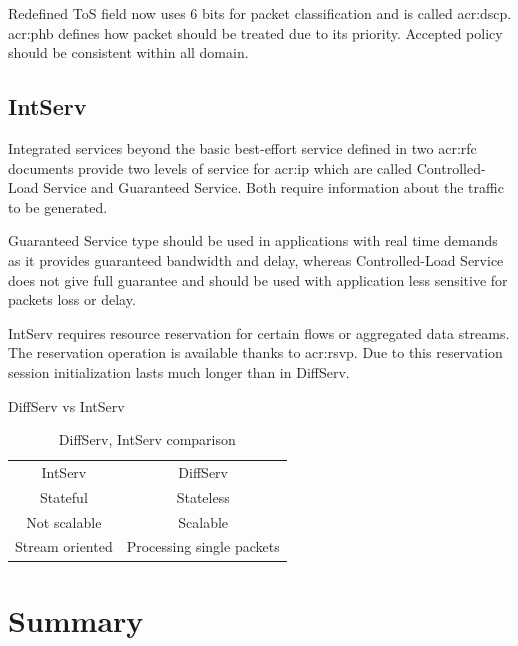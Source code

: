 \documentclass[11pt]{book}
\begin{document}
        \medskip

        Redefined ToS field now uses 6 bits for packet classification and is called \gls{acr:dscp}. \gls{acr:phb}
        defines how packet should be treated due to its priority. Accepted policy should be consistent within all
        domain.


      \subsection{IntServ}

        Integrated services beyond the basic best-effort service defined in two \gls{acr:rfc} documents provide two
        levels of service for \gls{acr:ip} which are called Controlled-Load Service and Guaranteed Service. Both require
        information about the traffic to be generated. 

        Guaranteed Service type should be used in applications with real time demands as it provides guaranteed
        bandwidth and delay, whereas Controlled-Load Service does not give full guarantee and should be used with
        application less sensitive for packets loss or delay.

        IntServ requires resource reservation for certain flows or aggregated data streams. The reservation operation is
        available thanks to \gls{acr:rsvp}. Due to this reservation session initialization lasts much longer than in
        DiffServ. \cite{qos2}

        {DiffServ vs IntServ}

        \begin{table}[ht]
          \caption{DiffServ, IntServ comparison}
          \centering %
          \begin{tabular}{c c}
            \hline \hline
            IntServ         & DiffServ \\
            Stateful        & Stateless \\
            Not scalable    & Scalable \\
            Stream oriented & Processing single packets \\
            \hline
          \end{tabular}
        \end{table}


    \section*{Summary}
\end{document}
